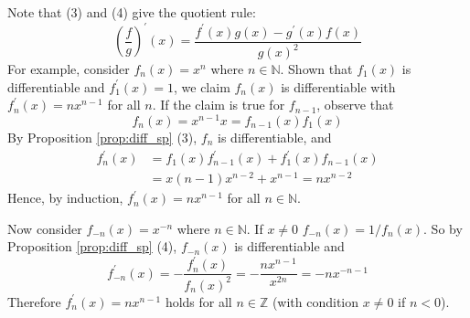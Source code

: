 \documentclass[10pt, a4paper, twoside]{report}
\begin{document}
Note that (3) and (4) give the quotient rule:
\[\left(\frac fg\right)^\prime(x)=\frac{f^\prime(x)g(x)-g^\prime(x)f(x)}{g(x)^2}\]
For example, consider \(f_n(x)=x^n\) where \(n\in\mathbb{N}\). Shown that \(f_1(x)\) is differentiable and \(f^\prime_1(x)=1\), we claim \(f_n(x)\) is differentiable with \(f_n^\prime(x)=nx^{n-1}\) for all \(n\). If the claim is true for \(f_{n-1}\), observe that
\[f_n(x)=x^{n-1}x=f_{n-1}(x)f_1(x)\]
By Proposition \ref{prop:diff_sp} (3), \(f_n\) is differentiable, and 
\begin{align*}
    f_n^\prime(x)&=f_1(x)f_{n-1}^\prime(x)+f_1^\prime(x)f_{n-1}(x) \\
    &=x(n-1)x^{n-2}+x^{n-1}=nx^{n-2}
\end{align*}
Hence, by induction,  \(f_n^\prime(x)=nx^{n-1}\) for all \(n\in\mathbb{N}\). 

Now consider \(f_{-n}(x)=x^{-n}\) where \(n\in\mathbb{N}\). If \(x\neq 0\) \(f_{-n}(x)=1/f_{n}(x)\). So by Proposition \ref{prop:diff_sp} (4), \(f_{-n}(x)\) is differentiable and 
\[f_{-n}^\prime(x)=-\frac{f_n^\prime(x)}{f_n(x)^2}=-\frac{nx^{n-1}}{x^{2n}}=-nx^{-n-1}\]
Therefore \(f_n^\prime(x)=nx^{n-1}\) holds for all \(n\in\mathbb{Z}\) (with condition \(x\neq 0\) if \(n<0\)).
\end{document}
